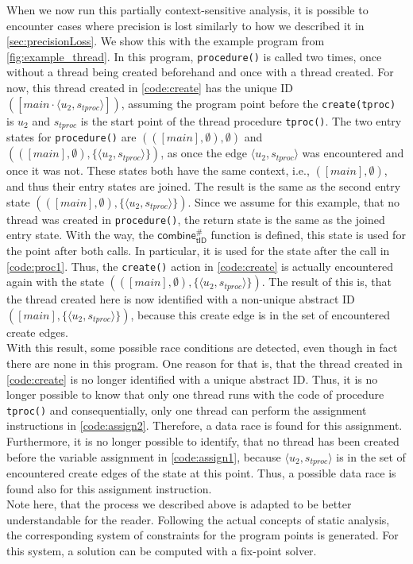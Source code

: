   When we now run this partially context-sensitive analysis, it is possible to encounter cases where precision is lost similarly to how we described it in \autoref{sec:precisionLoss}. We show this with the example program from \autoref{fig:example_thread}. In this program, \texttt{procedure()} is called two times, once without a thread being created beforehand and once with a thread created. For now, this thread created in \autoref{code:create} has the unique ID $([main \cdot \langle u_2, s_{tproc} \rangle])$, assuming the program point before the \texttt{create(tproc)} is $u_2$ and $s_{tproc}$ is the start point of the thread procedure \texttt{tproc()}. The two entry states for \texttt{procedure()} are $(([main], \emptyset), \emptyset)$ and $(([main], \emptyset), \{\langle u_2, s_{tproc} \rangle\})$, as once the edge $\langle u_2, s_{tproc} \rangle$ was encountered and once it was not. These states both have the same context, i.e., $([main], \emptyset)$, and thus their entry states are joined. The result is the same as the second entry state $(([main], \emptyset), \{\langle u_2, s_{tproc} \rangle\})$. Since we assume for this example, that no thread was created in \texttt{procedure()}, the return state is the same as the joined entry state. With the way, the $\textsf{combine}^{\#}_\textsf{tID}$ function is defined, this state is used for the point after both calls. In particular, it is used for the state after the call in \autoref{code:proc1}. Thus, the \texttt{create()} action in \autoref{code:create} is actually encountered again with the state $(([main], \emptyset), \{\langle u_2, s_{tproc} \rangle\})$. The result of this is, that the thread created here is now identified with a non-unique abstract ID $([main], \{\langle u_2, s_{tproc} \rangle\})$, because this create edge is in the set of encountered create edges.\\
  With this result, some possible race conditions are detected, even though in fact there are none in this program. One reason for that is, that the thread created in \autoref{code:create} is no longer identified with a unique abstract ID. Thus, it is no longer possible to know that only one thread runs with the code of procedure \texttt{tproc()} and consequentially, only one thread can perform the assignment instructions in \autoref{code:assign2}. Therefore, a data race is found for this assignment.\\
  Furthermore, it is no longer possible to identify, that no thread has been created before the variable assignment in \autoref{code:assign1}, because $\langle u_2, s_{tproc} \rangle$ is in the set of encountered create edges of the state at this point. Thus, a possible data race is found also for this assignment instruction.\\
  Note here, that the process we described above is adapted to be better understandable for the reader. Following the actual concepts of static analysis, the corresponding system of constraints for the program points is generated. For this system, a solution can be computed with a fix-point solver.\\

